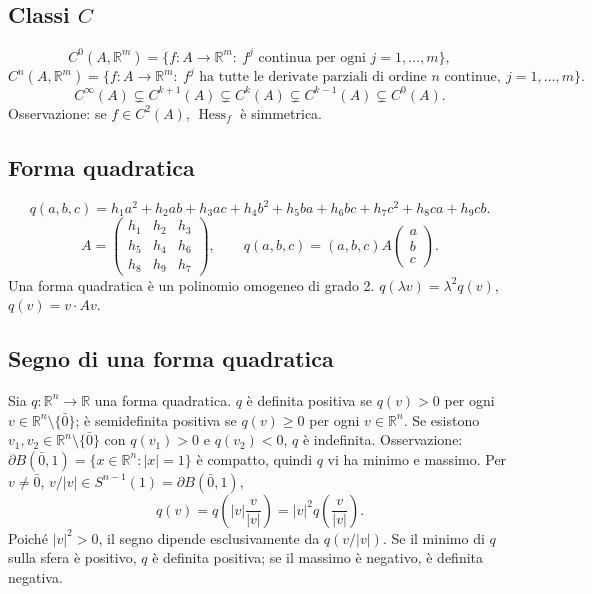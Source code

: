 \documentclass[11pt,a4paper]{article}
\newcommand{\R}{\mathbb R}\newcommand{\N}{\mathbb N}\newcommand{\pagina}[1]{\clearpage}
\begin{document}
\subsection*{Classi $C$}
\[C^0(A,\R^m)=\{f:A\to\R^m:\ f^j\text{ continua per ogni }j=1,\ldots,m\},\]
\[C^n(A,\R^m)=\{f:A\to\R^m:\ f^j\text{ ha tutte le derivate parziali di ordine }n\text{ continue},\ j=1,\ldots,m\}.\]
\[C^\infty(A)\subsetneq C^{k+1}(A)\subsetneq C^k(A)\subsetneq C^{k-1}(A)\subsetneq C^0(A).\]
Osservazione: se $f\in C^2(A)$, $\operatorname{Hess}_f$ è simmetrica.
\subsection*{Forma quadratica}
\[q(a,b,c)=h_1a^2+h_2ab+h_3ac+h_4b^2+h_5ba+h_6bc+h_7c^2+h_8ca+h_9cb.\]
\[A=\begin{pmatrix}h_1&h_2&h_3\\h_5&h_4&h_6\\h_8&h_9&h_7\end{pmatrix},\qquad q(a,b,c)=(a,b,c)A\begin{pmatrix}a\\b\\c\end{pmatrix}.\]
Una forma quadratica è un polinomio omogeneo di grado 2. $q(\lambda v)=\lambda^2q(v)$, $q(v)=v\cdot Av$.
\pagina{30}
\subsection*{Segno di una forma quadratica}
Sia $q:\R^n\to\R$ una forma quadratica. $q$ è definita positiva se $q(v)>0$ per ogni $v\in\R^n\setminus\{\bar0\}$; è semidefinita positiva se $q(v)\ge0$ per ogni $v\in\R^n$. Se esistono $v_1,v_2\in\R^n\setminus\{\bar0\}$ con $q(v_1)>0$ e $q(v_2)<0$, $q$ è indefinita.
Osservazione: $\partial B(\bar0,1)=\{x\in\R^n:|x|=1\}$ è compatto, quindi $q$ vi ha minimo e massimo. Per $v\ne\bar0$, $v/|v|\in S^{n-1}(1)=\partial B(\bar0,1)$,
\[q(v)=q\left(|v|\frac v{|v|}\right)=|v|^2q\left(\frac v{|v|}\right).\]
Poiché $|v|^2>0$, il segno dipende esclusivamente da $q(v/|v|)$. Se il minimo di $q$ sulla sfera è positivo, $q$ è definita positiva; se il massimo è negativo, è definita negativa.
\end{document}
